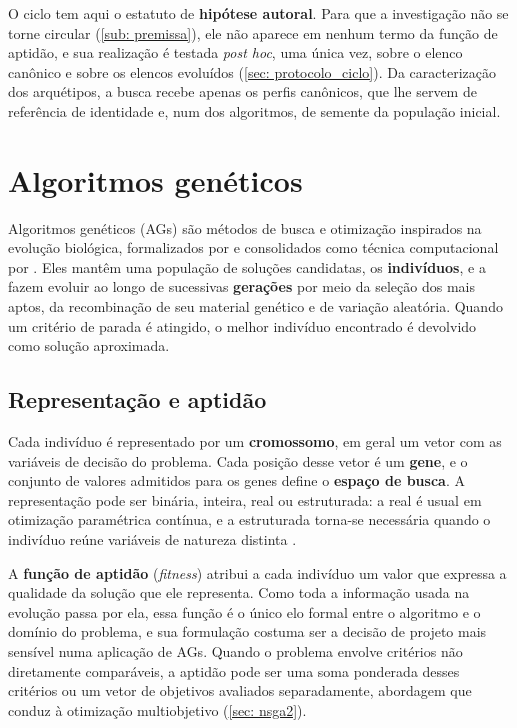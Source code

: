 O ciclo tem aqui o estatuto de \textbf{hipótese autoral}. Para que a investigação não se torne circular (\autoref{sub: premissa}), ele não aparece em nenhum termo da função de aptidão, e sua realização é testada \textit{post hoc}, uma única vez, sobre o elenco canônico e sobre os elencos evoluídos (\autoref{sec: protocolo_ciclo}). Da caracterização dos arquétipos, a busca recebe apenas os perfis canônicos, que lhe servem de referência de identidade e, num dos algoritmos, de semente da população inicial.

\section{Algoritmos genéticos}
\label{sec: ag}

Algoritmos genéticos (AGs) são métodos de busca e otimização inspirados na evolução biológica, formalizados por  e consolidados como técnica computacional por . Eles mantêm uma população de soluções candidatas, os \textbf{indivíduos}, e a fazem evoluir ao longo de sucessivas \textbf{gerações} por meio da seleção dos mais aptos, da recombinação de seu material genético e de variação aleatória. Quando um critério de parada é atingido, o melhor indivíduo encontrado é devolvido como solução aproximada.

\subsection{Representação e aptidão}

Cada indivíduo é representado por um \textbf{cromossomo}, em geral um vetor com as variáveis de decisão do problema. Cada posição desse vetor é um \textbf{gene}, e o conjunto de valores admitidos para os genes define o \textbf{espaço de busca}. A representação pode ser binária, inteira, real ou estruturada: a real é usual em otimização paramétrica contínua, e a estruturada torna-se necessária quando o indivíduo reúne variáveis de natureza distinta \cite{eiben2015introduction,mitchell1998introduction}.

A \textbf{função de aptidão} (\textit{fitness}) atribui a cada indivíduo um valor que expressa a qualidade da solução que ele representa. Como toda a informação usada na evolução passa por ela, essa função é o único elo formal entre o algoritmo e o domínio do problema, e sua formulação costuma ser a decisão de projeto mais sensível numa aplicação de AGs. Quando o problema envolve critérios não diretamente comparáveis, a aptidão pode ser uma soma ponderada desses critérios ou um vetor de objetivos avaliados separadamente, abordagem que conduz à otimização multiobjetivo (\autoref{sec: nsga2}).

